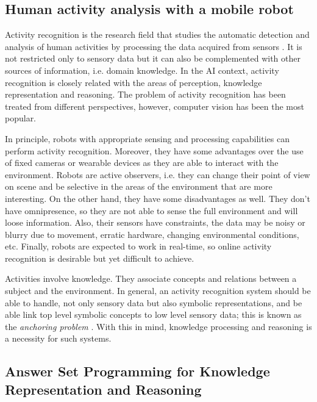 \subsection{Human activity analysis with a mobile robot}
Activity recognition is the research field that studies the automatic detection and analysis of human activities by processing the data acquired from sensors \citep{Aggarwal14_HumActRec3DRev}. 
It is not restricted only to sensory data but it can also be complemented with other sources of information, i.e. domain knowledge.
In the AI context, activity recognition is closely related with the areas of perception, knowledge representation and reasoning. 
The problem of activity recognition has been treated from different perspectives, however, computer vision has been the most popular.

In principle, robots with appropriate sensing and processing capabilities can perform activity recognition. 
Moreover, they have some advantages over the use of fixed cameras or wearable devices as they are able to interact with the environment. 
Robots are active observers, i.e. they can change their point of view on scene and be selective in the areas of the environment that are more interesting. 
On the other hand, they have some disadvantages as well. 
They don't have omnipresence, so they are not able to sense the full environment and will loose information.
Also, their sensors have constraints, the data may be noisy or blurry due to movement, erratic hardware, changing environmental conditions, etc. 
Finally, robots are expected to work in real-time, so online activity recognition is desirable but yet difficult to achieve.

Activities involve knowledge.
They associate concepts and relations between a subject and the environment.
In general, an activity recognition system should be able to handle, not only sensory data but also symbolic representations, and be able link top level symbolic concepts to low level sensory data; this is known as the \textit{anchoring problem} \citep{Coradeschi03_AnchoringProblem}.
With this in mind, knowledge processing and reasoning is a necessity for such systems.


\subsection{Answer Set Programming for Knowledge Representation and Reasoning}

